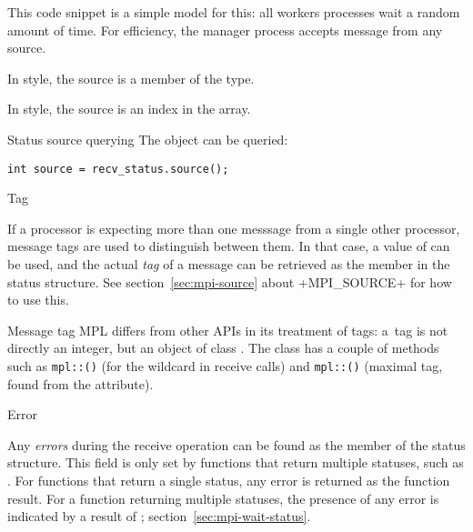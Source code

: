 This code snippet is a simple model for this: all workers processes wait
a random amount of time. For efficiency, the manager process accepts message from any source.


In  style, the source is a member of the  type.


In  style, the source is an index in the  array.


\begin{mplnote}{Status source querying}
The  object can be queried:
\begin{lstlisting}
int source = recv_status.source();
\end{lstlisting}
\end{mplnote}

 {Tag}
\label{sec:mpi-tag}

If a processor is expecting more than one messsage from a single other processor,
message tags are used to distinguish between them. In that case,
a value of  can be used, and the actual
\emph{tag}
of a message can be retrieved as the
%
%
member in the status structure.
See section~\ref{sec:mpi-source} about \clstinline+MPI_SOURCE+
for how to use this.

\begin{mplnote}{Message tag}
  \ac{MPL} differs from other \acp{API} in its treatment of tags:
  a~tag is not directly an integer, but an object of class .
  The  class has a couple of methods such as
  \lstinline+mpl::+\lstinline+()+
  (for the  wildcard in receive calls)
  and
  \lstinline+mpl::+\lstinline+()+
  (maximal tag, found from the  attribute).
\end{mplnote}

 {Error}
\label{sec:mpi-status-error}

Any \emph{errors}
during the receive operation can be found as the
member of the status structure.
This field is only set by functions that return multiple statuses,
such as .
For functions that return a single status, any error is returned
as the function result.
For a function returning multiple statuses, the presence of any error
is indicated by a result of ;
section~\ref{sec:mpi-wait-status}.

